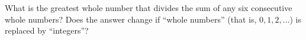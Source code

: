What is the greatest whole number that divides the sum of any six consecutive whole numbers? Does the answer change if ``whole numbers'' (that is, $0,1,2,\dots$) is replaced by ``integers''?
